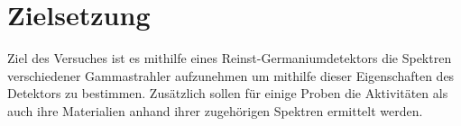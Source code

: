 
\section{Zielsetzung}
\label{sec:Zielsetzung}
Ziel des Versuches ist es mithilfe eines Reinst-Germaniumdetektors die Spektren verschiedener Gammastrahler aufzunehmen um mithilfe dieser Eigenschaften des Detektors zu bestimmen. Zusätzlich sollen für einige Proben die Aktivitäten als auch ihre Materialien anhand ihrer zugehörigen Spektren ermittelt werden.%
